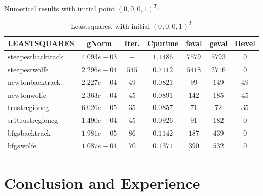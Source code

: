 \documentclass[11pt]{report}
\begin{document}
Numerical results with initial point $(0,0,0,1)^T$:
\begin{table}[H]
    \caption{Leastsquares, with initial $(0,0,0,1)^T$}
    \label{tab:Leastsquares_initial}
    \begin{center}
        \begin{tabular}{l|cccccc}
\textbf{LEASTSQUARES}&  gNorm       &   Iter.  &   Cputime   &   feval&geval&Hevel\\
\hline
steepestbacktrack   &   $4.093e-03 $&   $- $&   $1.1486  $&$7579 $&$5793 $&$0    $       \\
steepestwolfe       &   $2.296e-04 $&   $545  $&   $0.7112  $&$5418 $&$2716 $&$0    $       \\
newtonbacktrack     &   $2.227e-04 $&   $49   $&   $0.0821  $&$99   $&$149  $&$49   $       \\
newtonwolfe         &   $2.363e-04 $&   $45   $&   $0.0891  $&$142  $&$185  $&$45   $       \\
trustregioncg       &   $6.026e-05 $&   $35   $&   $0.0857  $&$71   $&$72   $&$35   $       \\
sr1trustregioncg    &   $1.490e-04 $&   $45   $&   $0.0926  $&$91   $&$182  $&$0    $       \\
bfgsbacktrack       &   $1.981e-05 $&   $86   $&   $0.1142  $&$187  $&$439  $&$0    $       \\
bfgswolfe           &   $1.087e-04 $&   $70   $&   $0.1371  $&$390  $&$532  $&$0    $       \\
 \end{tabular}
    \end{center}
\end{table}

\chapter{Conclusion and Experience}




\end{document}
